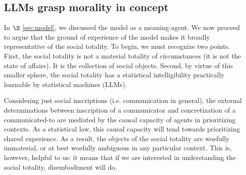 

\subsection{LLMs grasp morality in concept}
In $\S$ \ref{sec:model}, we discussed the model as a meaning-agent. We now proceed to argue that the ground of experience of the model makes it broadly representative of the social totality.
To begin, we must recognize two points. First, the social totality is not a material totality of circumstances (it is not the state of affairs).
It is the collection of social objects. 
Second, by virtue of this smaller sphere, the social totality has a statistical intelligibility practically learnable by statistical machines (LLMs).

Considering just social inscriptions (i.e. communication in general), the external determinations between inscription of a communicator and concretization of a communicated-to are mediated by the causal capacity of agents in prioritizing contexts.
As a statistical law, this causal capacity will tend towards prioritizing shared experience. As a result, the objects of the social totality are woefully immaterial, or at best woefully ambiguous
in any particular context. This is, however, helpful to us: it means that if we are interested in understanding the social totality, disembodiment will do.

